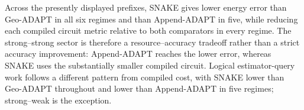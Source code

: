 \documentclass[
  reprint,
  amsmath,
  amssymb,
  aps,
  pra,
  nofootinbib,
  superscriptaddress,
  floatfix
]{revtex4-2}
\begin{document}
\clearpage
\twocolumngrid
\par\addvspace{0.45ex}
Across the presently displayed prefixes, SNAKE gives lower energy error than
Geo-ADAPT in all six regimes and than Append-ADAPT in five, while reducing each
compiled circuit metric relative to both comparators in every regime. The
strong--strong sector is therefore a resource--accuracy tradeoff rather than a
strict accuracy improvement: Append-ADAPT reaches the lower error, whereas
SNAKE uses the substantially smaller compiled circuit. Logical estimator-query
work follows a different pattern from compiled cost, with SNAKE lower than
Geo-ADAPT throughout and lower than Append-ADAPT in five regimes; strong--weak
is the exception.
\par\addvspace{1.0ex}
\par\addvspace{1.0ex}
\end{document}
